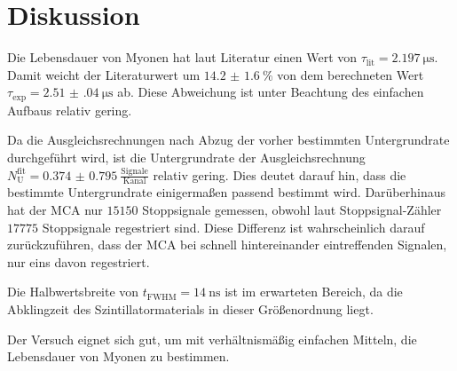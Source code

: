 \section{Diskussion}
\label{sec:Diskussion}


Die Lebensdauer von Myonen hat laut Literatur \cite{Elementarteilchenphysik} einen Wert von $\tau_\text{lit} = \SI{2.197}{\micro\s}$. 
Damit weicht der Literaturwert um $\SI{14.2(16)}{\percent}$ von dem berechneten Wert $\tau_\text{exp} = \SI{2.51(04)}{\micro\s}$ ab. Diese Abweichung ist unter Beachtung des einfachen Aufbaus relativ gering. 

Da die Ausgleichsrechnungen nach Abzug der vorher bestimmten Untergrundrate durchgeführt wird, ist die Untergrundrate der Ausgleichsrechnung $N_\text{U}^{\text{fit}} = \num{0.374(0795)} \: \frac{\text{Signale}}{\text{Kanal}}$ relativ gering. Dies deutet darauf hin, dass die bestimmte Untergrundrate einigermaßen passend bestimmt wird. Darüberhinaus hat der MCA nur $\num{15150}$ Stoppsignale gemessen, obwohl laut Stoppsignal-Zähler $\num{17775}$ Stoppsignale regestriert sind. Diese Differenz ist wahrscheinlich darauf zurückzuführen, dass der MCA bei schnell hintereinander eintreffenden Signalen, nur eins davon regestriert. 

Die Halbwertsbreite von $t_\text{FWHM} = \SI{14}{\nano\s}$ ist im erwarteten Bereich, da die Abklingzeit des Szintillatormaterials in dieser Größenordnung liegt. 

Der Versuch eignet sich gut, um mit verhältnismäßig einfachen Mitteln, die Lebensdauer von Myonen zu bestimmen.

